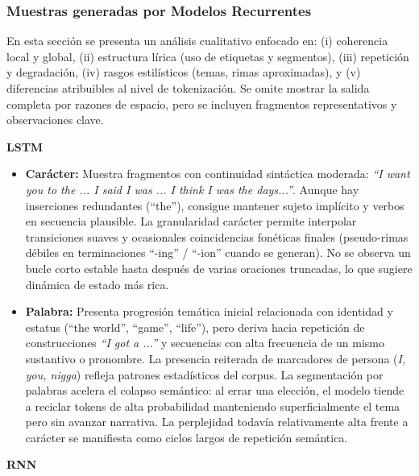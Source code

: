\documentclass[paper=letter, fontsize=11pt, draft=false]{scrartcl}
\numberwithin{equation}{section} %
\numberwithin{figure}{section} %
\numberwithin{table}{section} %
\numberwithin{subsection}{section}
\begin{document}
\subsubsection{Muestras generadas por Modelos Recurrentes}

En esta sección se presenta un análisis cualitativo enfocado en: (i) coherencia local y global, (ii) estructura lírica (uso de etiquetas y segmentos), (iii) repetición y degradación, (iv) rasgos estilísticos (temas, rimas aproximadas), y (v) diferencias atribuibles al nivel de tokenización. Se omite mostrar la salida completa por razones de espacio, pero se incluyen fragmentos representativos y observaciones clave.

\textbf{LSTM}

\begin{itemize}
    \item \textbf{Carácter:} Muestra fragmentos con continuidad sintáctica moderada: \textit{``I want you to the ... I said I was ... I think I was the days...''}. Aunque hay inserciones redundantes (``the''), consigue mantener sujeto implícito y verbos en secuencia plausible. La granularidad carácter permite interpolar transiciones suaves y ocasionales coincidencias fonéticas finales (pseudo-rimas débiles en terminaciones ``-ing'' / ``-ion'' cuando se generan). No se observa un bucle corto estable hasta después de varias oraciones truncadas, lo que sugiere dinámica de estado más rica.
    \item \textbf{Palabra:} Presenta progresión temática inicial relacionada con identidad y estatus (``the world'', ``game'', ``life''), pero deriva hacia repetición de construcciones \textit{``I got a ...''} y secuencias con alta frecuencia de un mismo sustantivo o pronombre. La presencia reiterada de marcadores de persona (\textit{I, you, nigga}) refleja patrones estadísticos del corpus. La segmentación por palabras acelera el colapso semántico: al errar una elección, el modelo tiende a reciclar tokens de alta probabilidad manteniendo superficialmente el tema pero sin avanzar narrativa. La perplejidad todavía relativamente alta frente a carácter se manifiesta como ciclos largos de repetición semántica.
\end{itemize}

\textbf{RNN}
\end{document}
